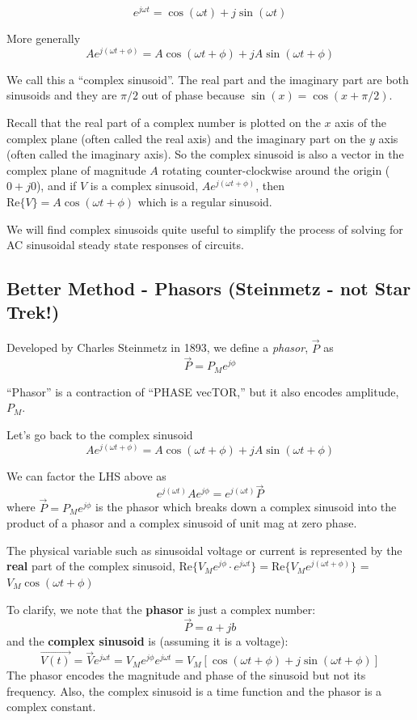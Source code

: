 \[
e^{j\omega t} = \cos(\omega t) + j\sin(\omega t)
\]

More generally
\[
Ae^{j(\omega t + \phi)} = A\cos(\omega t + \phi) + jA\sin(\omega t + \phi)
\]

We call this a ``complex sinusoid''.
The real part and the imaginary part are
both sinusoids and they are $\pi/2$ out of phase because $\sin(x) = \cos(x+\pi/2)$.

Recall that the real part of a complex number is plotted on the $x$ axis
of the complex plane (often called the real axis) and the imaginary part
on the $y$ axis (often called the imaginary axis).   So the complex sinusoid
is also a vector in the complex plane
of magnitude $A$ rotating counter-clockwise around the origin ($0+j0$),
and if $V$ is a complex sinusoid, $Ae^{j(\omega t+\phi)}$,
then $\text{Re}\{V\} = A\cos(\omega t + \phi)$
which is a regular sinusoid.

We will find complex sinusoids quite useful to simplify the process of solving
for AC sinusoidal steady state responses of circuits.


\subsection*{Better Method - Phasors (Steinmetz - not Star Trek!)}

Developed by Charles Steinmetz in 1893, we
define a {\it phasor}, $\vec{P}$ as
\[
    \vec{P} = P_M e^{j\phi}
\]

``Phasor'' is a contraction of ``PHASE vecTOR,''
but it also encodes amplitude, $P_M$.

Let's go back to the complex sinusoid
\[
Ae^{j(\omega t + \phi)} = A\cos(\omega t + \phi) + jA\sin(\omega t + \phi)
\]

We can factor the LHS above as
\[
e^{j(\omega t)}Ae^{j\phi} = e^{j(\omega t)}\vec{P}
\]
where $\vec{P}=P_Me^{j\phi}$ is the phasor which breaks down a complex
sinusoid into the product of a phasor and a
complex sinusoid of unit mag at zero phase.

The physical variable such as sinusoidal voltage or current is represented by
the {\bf real} part of the complex sinusoid,
 $\text{Re}\{V_M e^{j\phi} \cdot e^{j\omega t}\} = \text{Re}\{V_M e^{j(\omega t+\phi)}\}$
= $V_M\cos(\omega t + \phi)$

To clarify, we note that the {\bf phasor} is just a complex number:
\[
\vec{P} = a + jb
\]
and the {\bf complex sinusoid} is (assuming it is a voltage):
\[
\vec{V(t)} = \vec{V}e^{j\omega t} = V_Me^{j\phi}e^{j\omega t} = V_M [\cos(\omega t + \phi)+j\sin(\omega t + \phi)]
\]
The phasor encodes the magnitude and phase of the sinusoid but not its frequency. Also, the
complex sinusoid is a time function and the phasor is a complex constant.

